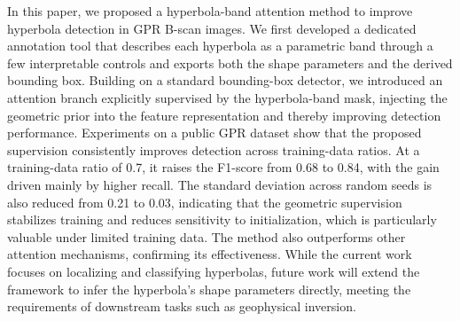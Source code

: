 \documentclass[lettersize,journal]{IEEEtran}
\begin{document}
In this paper, we proposed a hyperbola-band attention method to improve
hyperbola detection in GPR B-scan images. We first developed a dedicated
annotation tool that describes each hyperbola as a parametric band through a few
interpretable controls and exports both the shape parameters and the derived
bounding box. Building on a standard bounding-box detector, we introduced an
attention branch explicitly supervised by the hyperbola-band mask, injecting the
geometric prior into the feature representation and thereby improving detection
performance. Experiments on a public GPR dataset show that the proposed
supervision consistently improves detection across training-data ratios. At a
training-data ratio of 0.7, it raises the F1-score from 0.68 to 0.84, with the
gain driven mainly by higher recall. The standard deviation across random seeds
is also reduced from 0.21 to 0.03, indicating that the geometric supervision
stabilizes training and reduces sensitivity to initialization, which is
particularly valuable under limited training data. The method also outperforms
other attention mechanisms, confirming its effectiveness. While the current work
focuses on localizing and classifying hyperbolas, future work will extend the
framework to infer the hyperbola's shape parameters directly, meeting the
requirements of downstream tasks such as geophysical inversion.


\end{document}
